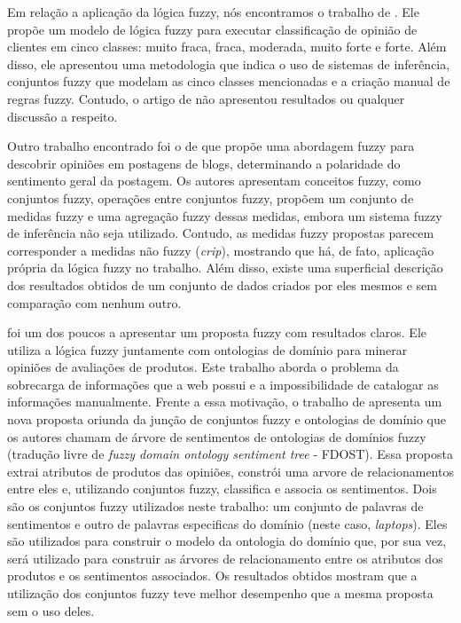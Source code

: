 \documentclass[template.tex]{subfiles}
\begin{document}
Em relação a aplicação da lógica fuzzy, nós encontramos o trabalho de . Ele propõe um modelo de lógica fuzzy para executar classificação de opinião de clientes em cinco classes: muito fraca, fraca, moderada, muito forte e forte. Além disso, ele apresentou uma metodologia que indica o uso de sistemas de inferência, conjuntos fuzzy que modelam as cinco classes mencionadas e a criação manual de regras fuzzy. Contudo, o artigo de  não apresentou resultados ou qualquer discussão a respeito.

Outro trabalho encontrado foi o de  que propõe uma abordagem fuzzy para descobrir opiniões em postagens de blogs, determinando a polaridade do sentimento geral da postagem. Os autores apresentam conceitos fuzzy, como conjuntos fuzzy, operações entre conjuntos fuzzy, propõem um conjunto de medidas fuzzy e uma agregação fuzzy dessas medidas, embora um sistema fuzzy de inferência não seja utilizado. Contudo, as medidas fuzzy propostas parecem corresponder a medidas não fuzzy (\textit{crip}), mostrando que há, de fato, aplicação própria da lógica fuzzy no trabalho. Além disso, existe uma superficial descrição dos resultados obtidos de um conjunto de dados criados por eles mesmos e sem comparação com nenhum outro.

 foi um dos poucos a apresentar um proposta fuzzy com resultados claros. Ele utiliza a lógica fuzzy  juntamente com ontologias de domínio para minerar opiniões de avaliações de produtos. Este trabalho aborda o problema da sobrecarga de informações que a web possui e a impossibilidade de catalogar as informações manualmente. Frente a essa motivação, o trabalho de  apresenta um nova proposta oriunda da junção de conjuntos fuzzy e ontologias de domínio que os autores chamam de árvore de sentimentos de ontologias de domínios fuzzy (tradução livre de \textit{fuzzy domain ontology sentiment tree} - FDOST). Essa proposta extrai atributos de produtos das opiniões, constrói uma arvore de relacionamentos entre eles e, utilizando conjuntos fuzzy, classifica e associa os sentimentos. Dois são os conjuntos fuzzy utilizados neste trabalho: um conjunto de palavras de sentimentos e outro de palavras especificas do domínio (neste caso, \textit{laptops}). Eles são utilizados para construir o modelo da ontologia do domínio que, por sua vez, será utilizado para construir as árvores de relacionamento entre os atributos dos produtos e os sentimentos associados. Os resultados obtidos mostram que a utilização dos conjuntos fuzzy teve melhor desempenho que a mesma proposta sem o uso deles. 
\end{document}
